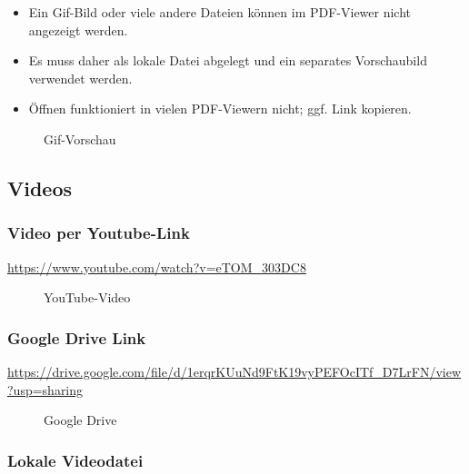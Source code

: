 \documentclass[12pt,ngerman]{scrartcl}
\begin{document}
\begin{itemize}
\item Ein Gif-Bild oder viele andere Dateien können im PDF-Viewer nicht angezeigt werden.
\item Es muss daher als lokale Datei abgelegt und ein separates Vorschaubild verwendet werden.
\item Öffnen funktioniert in vielen PDF-Viewern nicht; ggf. Link kopieren.
\end{itemize}

\begin{figure}
  \caption{Gif-Vorschau}
\end{figure}

\subsection{Videos}

\subsubsection*{Video per Youtube-Link}

\noindent\url{https://www.youtube.com/watch?v=eTOM_303DC8}

\begin{figure}
  \caption{YouTube-Video}
\end{figure}

\subsubsection*{Google Drive Link}

\noindent\url{https://drive.google.com/file/d/1erqrKUuNd9FtK19vyPEFOcITf_D7LrFN/view?usp=sharing}

\begin{figure}
  \caption{Google Drive}
\end{figure}

\subsubsection*{Lokale Videodatei}
\end{document}
